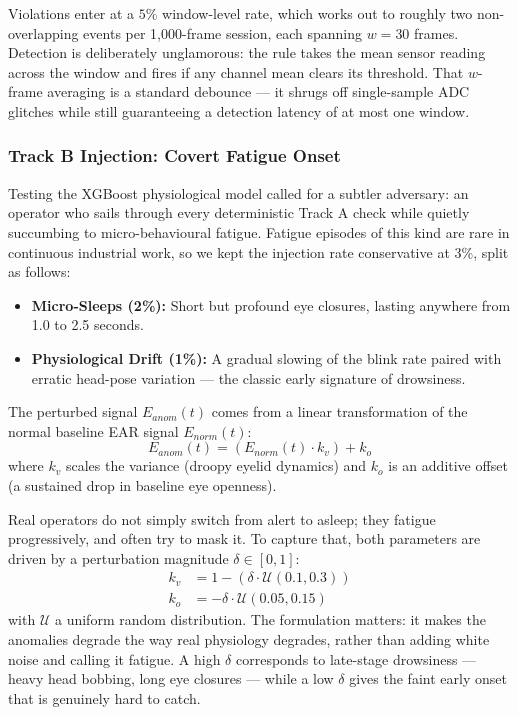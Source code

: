 Violations enter at a $5\%$ window-level rate, which works out to roughly two
non-overlapping events per 1{,}000-frame session, each spanning $w = 30$
frames. Detection is deliberately unglamorous: the rule takes the mean sensor
reading across the window and fires if any channel mean clears its threshold.
That $w$-frame averaging is a standard debounce --- it shrugs off
single-sample ADC glitches while still guaranteeing a detection latency of at
most one window.

\subsubsection{Track B Injection: Covert Fatigue Onset}
Testing the XGBoost physiological model called for a subtler adversary: an
operator who sails through every deterministic Track A check while quietly
succumbing to micro-behavioural fatigue. Fatigue episodes of this kind are rare
in continuous industrial work, so we kept the injection rate conservative at
3\%, split as follows:
\begin{itemize}
    \item \textbf{Micro-Sleeps (2\%):} Short but profound eye closures, lasting
    anywhere from 1.0 to 2.5 seconds.
    \item \textbf{Physiological Drift (1\%):} A gradual slowing of the blink
    rate paired with erratic head-pose variation --- the classic early
    signature of drowsiness.
\end{itemize}

The perturbed signal $E_{anom}(t)$ comes from a linear transformation of the
normal baseline EAR signal $E_{norm}(t)$:
\begin{equation}
    E_{anom}(t) = (E_{norm}(t) \cdot k_v) + k_o
\end{equation}
where $k_v$ scales the variance (droopy eyelid dynamics) and $k_o$ is an
additive offset (a sustained drop in baseline eye openness).

Real operators do not simply switch from alert to asleep; they fatigue
progressively, and often try to mask it. To capture that, both parameters are
driven by a perturbation magnitude $\delta \in [0, 1]$:
\begin{align}
    k_v &= 1 - (\delta \cdot \mathcal{U}(0.1, 0.3)) \\
    k_o &= -\delta \cdot \mathcal{U}(0.05, 0.15)
\end{align}
with $\mathcal{U}$ a uniform random distribution. The formulation matters: it
makes the anomalies degrade the way real physiology degrades, rather than
adding white noise and calling it fatigue. A high $\delta$ corresponds to
late-stage drowsiness --- heavy head bobbing, long eye closures --- while a low
$\delta$ gives the faint early onset that is genuinely hard to catch.


